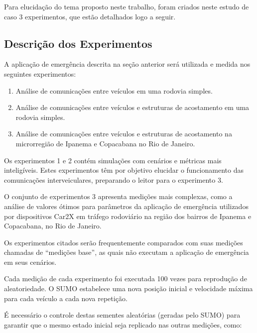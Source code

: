 \documentclass[
12pt,				%
openright,			%
oneside,			%
a4paper,			%
brazil,				%
]{abntex2}
\begin{document}
	\par Para elucidação do tema proposto neste trabalho, foram criados neste estudo de caso 3 experimentos, que estão detalhados logo a seguir.

	\subsection{Descrição dos Experimentos}

	\par A aplicação de emergência descrita na seção anterior será utilizada e medida nos seguintes experimentos: 

	\begin{enumerate}
		\item Análise de comunicações entre veículos em uma rodovia simples.
		\item Análise de comunicações entre veículos e estruturas de acostamento em uma rodovia simples.
		\item Análise de comunicações entre veículos e estruturas de acostamento na microrregião de Ipanema e Copacabana no Rio de Janeiro.
	\end{enumerate}

	\par Os experimentos 1 e 2 contém simulações com cenários e métricas mais inteligíveis. Estes experimentos têm por objetivo elucidar o funcionamento das comunicações interveiculares, preparando o leitor para o experimento 3.

	\par O conjunto de experimentos 3 apresenta medições mais complexas, como a análise de valores ótimos para parâmetros da aplicação de emergência utilizados por dispositivos Car2X em tráfego rodoviário na região dos bairros de Ipanema e Copacabana, no Rio de Janeiro.

	\par Os experimentos citados serão frequentemente comparados com suas medições chamadas de “medições base”, as quais não executam a aplicação de emergência em seus cenários.

	\par Cada medição de cada experimento foi executada 100 vezes para reprodução de aleatoriedade. O SUMO estabelece uma nova posição inicial e velocidade máxima para cada veículo a cada nova repetição.

	\par É necessário o controle destas sementes aleatórias (geradas pelo SUMO) para garantir que o mesmo estado inicial seja replicado nas outras medições, como:
\end{document}

